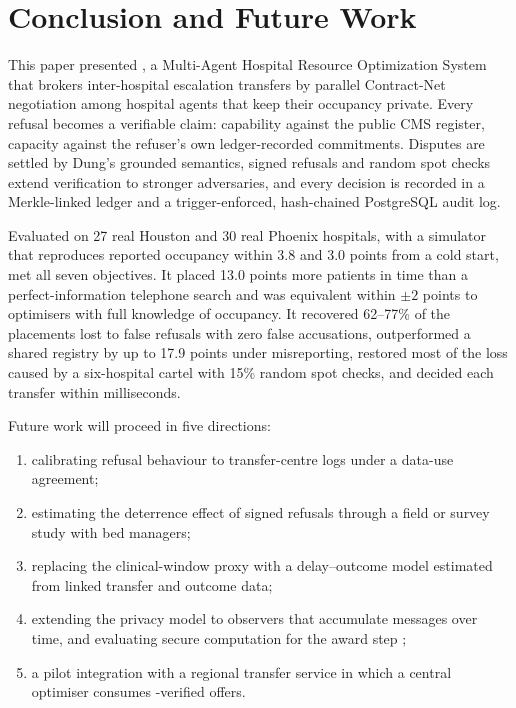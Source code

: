 \section{Conclusion and Future Work}
\label{sec:conclusion}

This paper presented \mahros{}, a Multi-Agent Hospital Resource Optimization System that brokers inter-hospital escalation transfers by parallel Contract-Net negotiation among hospital agents that keep their occupancy private. Every refusal becomes a verifiable claim: capability against the public CMS register, capacity against the refuser's own ledger-recorded commitments. Disputes are settled by Dung's grounded semantics, signed refusals and random spot checks extend verification to stronger adversaries, and every decision is recorded in a Merkle-linked ledger and a trigger-enforced, hash-chained PostgreSQL audit log.

Evaluated on 27 real Houston and 30 real Phoenix hospitals, with a simulator that reproduces reported occupancy within 3.8 and 3.0 points from a cold start, \mahros{} met all seven objectives. It placed 13.0 points more patients in time than a perfect-information telephone search and was equivalent within $\pm2$ points to optimisers with full knowledge of occupancy. It recovered 62--77\% of the placements lost to false refusals with zero false accusations, outperformed a shared registry by up to 17.9 points under misreporting, restored most of the loss caused by a six-hospital cartel with 15\% random spot checks, and decided each transfer within milliseconds.

Future work will proceed in five directions:
\begin{enumerate}
\setlength{\itemsep}{1pt}
\item calibrating refusal behaviour to transfer-centre logs under a data-use agreement;
\item estimating the deterrence effect of signed refusals through a field or survey study with bed managers;
\item replacing the clinical-window proxy with a delay--outcome model estimated from linked transfer and outcome data;
\item extending the privacy model to observers that accumulate messages over time, and evaluating secure computation for the award step \cite{leaute2013privacy};
\item a pilot integration with a regional transfer service in which a central optimiser consumes \mahros{}-verified offers.
\end{enumerate}
